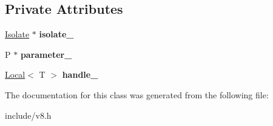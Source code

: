 \subsection*{Private Attributes}
\begin{DoxyCompactItemize}
\item 
\hyperlink{classv8_1_1_isolate}{Isolate} $\ast$ {\bfseries isolate\+\_\+}\hypertarget{classv8_1_1_weak_callback_data_ac08d995d95da3c172ec6d0ca610383ab}{}\label{classv8_1_1_weak_callback_data_ac08d995d95da3c172ec6d0ca610383ab}

\item 
P $\ast$ {\bfseries parameter\+\_\+}\hypertarget{classv8_1_1_weak_callback_data_a498f1f5d7bf69b62c4ea82dd716486cd}{}\label{classv8_1_1_weak_callback_data_a498f1f5d7bf69b62c4ea82dd716486cd}

\item 
\hyperlink{classv8_1_1_local}{Local}$<$ T $>$ {\bfseries handle\+\_\+}\hypertarget{classv8_1_1_weak_callback_data_a2b071a0330e236d48217d6ad3562d9ff}{}\label{classv8_1_1_weak_callback_data_a2b071a0330e236d48217d6ad3562d9ff}

\end{DoxyCompactItemize}


The documentation for this class was generated from the following file\+:\begin{DoxyCompactItemize}
\item 
include/v8.\+h\end{DoxyCompactItemize}
